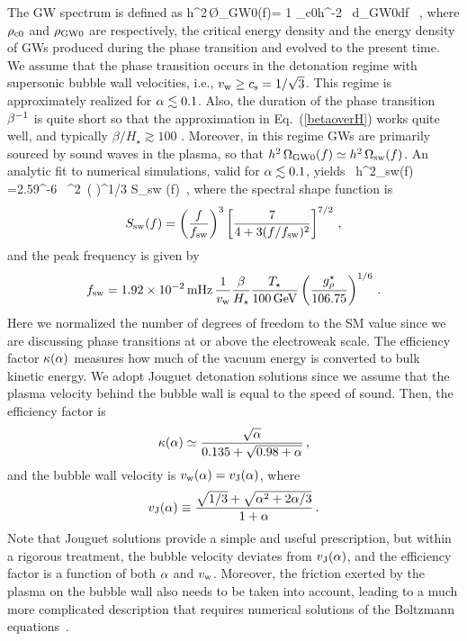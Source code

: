 \documentclass[a4paper,11pt]{article}
\begin{document}
The GW spectrum is defined as
\be
h^2\,\O_{{\rm GW}0}(f)=  {1 \over \rho_{{\rm c}0}h^{-2}} \,  {d\rho_{{\rm GW}0}\over d\ln f} \,  ,
\ee 
where $\rho_{{\rm c}0}$ and $\rho_{{\rm GW}0}$ are respectively, the critical energy density and 
the  energy density of GWs produced during the phase transition and evolved to the present time. 
We assume that the phase transition occurs in the detonation regime with supersonic bubble wall 
velocities, i.e., $v_{\rm w} \geq c_{\rm s} = {1/\sqrt{3}}$.
This regime is approximately realized for $\alpha \lesssim 0.1$. Also, the duration of the phase
transition $\beta^{-1}$ is quite short so that the approximation in Eq.~(\ref{betaoverH}) works quite well,
and typically $\beta/H_{\star} \gtrsim 100$ \cite{Ellis:2020awk}.  Moreover, in this regime GWs are primarily sourced
by sound waves in the plasma, so that $h^2 \, \Omega_{{\rm GW} 0}(f) \simeq h^2 \, \Omega_{\rm sw}(f)$. 
An analytic fit to numerical simulations, valid for $\alpha \lesssim 0.1$, yields~\cite{Caprini:2015zlo,Caprini:2019egz}
\be\label{omegasw}
h^2\Omega_{\rm sw}(f) =2.59^{-6} \,  ^2  
\,\left(  \right)^{1/3} S_{\rm sw} (f) \,,
\ee
where the spectral shape function is
\begin{eqnarray}
S_{\rm sw} (f) = \left(\frac{f}{f_{\rm sw}}\right)^3 \left[\frac{7}{4+3({f/f_{\rm sw}})^2} \right]^{7/2} \,  ,
\end{eqnarray} 
and the peak frequency is given by
\begin{eqnarray} \label{fpeak}
f_{\rm sw} =1.92\times 10^{-2}\,{\rm mHz} \, \frac{1}{v_{\rm w}} \frac{\beta}{H_\star}  \frac{T_\star}{\rm 100\,GeV} \left( \frac{g_\rho^\star}{106.75} \right)^{1/6} \, .
\end{eqnarray}
Here we normalized the number of degrees of freedom to the SM value since we are discussing phase transitions at or above the electroweak scale.
The efficiency factor $\kappa(\alpha)$ measures how much of the vacuum energy is converted to bulk kinetic energy. 
We adopt Jouguet detonation solutions since we assume that the plasma velocity behind the bubble wall
is equal to the speed of sound. Then, the efficiency factor is~\cite{Steinhardt:1981ct} 
\begin{eqnarray}
\kappa(\alpha) \simeq \frac{\sqrt{\alpha}}{0.135+\sqrt{0.98+\alpha}} \,,
\label{efficiencyfactor}
\end{eqnarray}
and the bubble wall velocity is $v_{\rm w}(\alpha) = v_{\rm J}(\alpha)$, where
\begin{eqnarray} \label{eq:Jouguet}
v_{\rm J}(\alpha) \equiv \frac{\sqrt{1/3} + \sqrt{\alpha^2 +2\alpha/3}}{1+\alpha}\,.
\end{eqnarray}
Note that Jouguet solutions provide a simple and useful prescription, but within a rigorous treatment, the bubble velocity deviates from $v_{\rm J}(\alpha)$, and the efficiency factor is a function of both $\alpha$ and $v_{\rm w}$. Moreover, the friction exerted by the plasma on the bubble wall also needs to be taken into account, leading to a much more complicated description that requires numerical solutions of the Boltzmann equations~\cite{Espinosa:2010hh}. 
\end{document}
